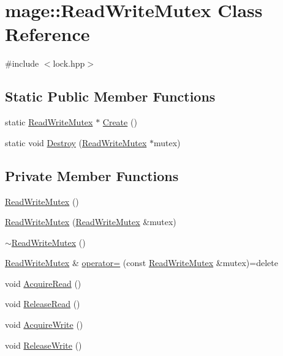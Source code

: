 \hypertarget{classmage_1_1_read_write_mutex}{}\section{mage\+:\+:Read\+Write\+Mutex Class Reference}
\label{classmage_1_1_read_write_mutex}


{\ttfamily \#include $<$lock.\+hpp$>$}

\subsection*{Static Public Member Functions}
\begin{DoxyCompactItemize}
\item 
static \hyperlink{classmage_1_1_read_write_mutex}{Read\+Write\+Mutex} $\ast$ \hyperlink{classmage_1_1_read_write_mutex_ad184ba46c44446b5ebe1026801fcac9b}{Create} ()
\item 
static void \hyperlink{classmage_1_1_read_write_mutex_a879992fe8bf7fc81df9fa5ffa1c380a3}{Destroy} (\hyperlink{classmage_1_1_read_write_mutex}{Read\+Write\+Mutex} $\ast$mutex)
\end{DoxyCompactItemize}
\subsection*{Private Member Functions}
\begin{DoxyCompactItemize}
\item 
\hyperlink{classmage_1_1_read_write_mutex_aae10694de3862f2d1059477169883940}{Read\+Write\+Mutex} ()
\item 
\hyperlink{classmage_1_1_read_write_mutex_ae58b656dabbee6ccad6d0d89b85bf018}{Read\+Write\+Mutex} (\hyperlink{classmage_1_1_read_write_mutex}{Read\+Write\+Mutex} \&mutex)
\item 
\hyperlink{classmage_1_1_read_write_mutex_a73676d9414658d63edfe443ee1d55c8b}{$\sim$\+Read\+Write\+Mutex} ()
\item 
\hyperlink{classmage_1_1_read_write_mutex}{Read\+Write\+Mutex} \& \hyperlink{classmage_1_1_read_write_mutex_a408e06f3c8bcc644e43afbf7e9ac772f}{operator=} (const \hyperlink{classmage_1_1_read_write_mutex}{Read\+Write\+Mutex} \&mutex)=delete
\item 
void \hyperlink{classmage_1_1_read_write_mutex_af78045647078aaf3966c8f1b06e35c92}{Acquire\+Read} ()
\item 
void \hyperlink{classmage_1_1_read_write_mutex_a0af5059a9bd16abd8a21b15e7ebe053d}{Release\+Read} ()
\item 
void \hyperlink{classmage_1_1_read_write_mutex_a76137013107a9c2c1fc05c1e0747965e}{Acquire\+Write} ()
\item 
void \hyperlink{classmage_1_1_read_write_mutex_ad0fd296bdaa212f54a58372c8dfe1d1d}{Release\+Write} ()
\end{DoxyCompactItemize}
